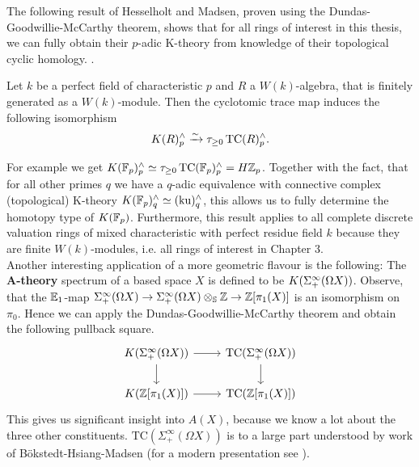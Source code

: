 The following result of Hesselholt and Madsen, proven using the Dundas-Goodwillie-McCarthy theorem, shows that for all rings of interest in this thesis, we can fully obtain their $p$-adic K-theory from knowledge of their topological cyclic homology.  
. 
\begin{thm}\cite[Theorem~D]{HMWV}
    Let $k$ be a perfect field of characteristic $p$ and $R$ a $W(k)$-algebra, that is finitely generated as a $W(k)$-module. Then the cyclotomic trace map induces the following isomorphism
    \begin{align*}
        K(R)_p^{\wedge}\xrightarrow{\sim} \tau_{\geq 0}\operatorname{TC}(R)_p^{\wedge}.
    \end{align*}
\end{thm}
For example we get $K(\mathbb{F}_p)_p^{\wedge}\simeq \tau_{\geq 0}\operatorname{TC}(\mathbb{F}_p)_p^{\wedge}=H\mathbb{Z}_p$. Together with the fact, that for all other primes $q$ we have a $q$-adic equivalence with connective complex (topological) K-theory $K(\mathbb{F}_p)_q^{\wedge}\simeq (\mathrm{ku})_q^{\wedge}$, this allows us to fully determine the homotopy type of $K(\mathbb{F}_p)$. 
Furthermore, this result applies to all complete discrete valuation rings of mixed characteristic with perfect residue field $k$ because they are finite $W(k)$-modules, i.e. all rings of interest in Chapter 3. \\
Another interesting application of a more geometric flavour is the following: The \textbf{A-theory} spectrum of a based space $X$ is defined to be $K(\Sigma^{\infty}_{+}(\Omega X))$. Observe, that the $\mathbb{E}_1$-map $\Sigma^{\infty}_{+}(\Omega X)\rightarrow \Sigma^{\infty}_{+}(\Omega X)\otimes_{\mathbb{S}}\mathbb{Z}\rightarrow \mathbb{Z}[\pi_1(X)]$ is an isomorphism on $\pi_0$. Hence we can apply the Dundas-Goodwillie-McCarthy theorem and obtain the following pullback square.
\[\begin{tikzcd}
	{K(\Sigma^\infty_+(\Omega X))} & {\mathrm{TC}(\Sigma^\infty_+(\Omega X))} \\
	{K(\mathbb{Z}[\pi_1(X)])} & {\mathrm{TC}(\mathbb{Z}[\pi_1(X)])}
	\arrow[from=1-1, to=1-2]
	\arrow[from=1-2, to=2-2]
	\arrow[from=1-1, to=2-1]
	\arrow[from=2-1, to=2-2]
\end{tikzcd}\]
This gives us significant insight into $A(X)$, because we know a lot about the three other constituents.
${\text{TC}(\Sigma^\infty_+(\Omega X))}$ is to a large part understood by work of Bökstedt-Hsiang-Madsen \cite{BHMtrace} (for a modern presentation see \cite[Section~IV.3]{NS}). 
